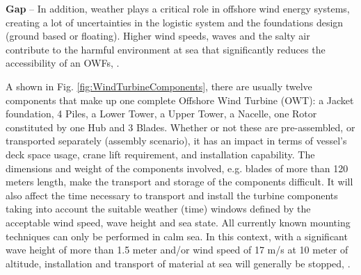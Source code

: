 \textbf{Gap} --
In addition, weather plays a critical role in offshore wind energy systems, creating a lot of uncertainties in the logistic system and the foundations design (ground based or floating). Higher wind speeds, waves and the salty air contribute to the harmful environment at sea that significantly reduces the accessibility of an OWFs, \cite{Smit_2007, Walker_2013}.

A shown in Fig. \ref{fig:WindTurbineComponents}, there are usually twelve components that make up one complete Offshore Wind Turbine (OWT): a Jacket foundation, 4 Piles, a Lower Tower, a Upper Tower, a Nacelle, one Rotor constituted by one Hub and 3 Blades. Whether or not these are pre-assembled, or transported separately (assembly scenario), it has an impact in terms of vessel’s deck space usage, crane lift requirement, and installation capability. The dimensions and weight of the components involved, e.g. blades of more than 120 meters length, make the transport and storage of the components difficult. It will also affect the time necessary to transport and install the turbine components taking into account the suitable weather (time) windows defined by the acceptable wind speed, wave height and sea state. All currently known mounting techniques can only be performed in calm sea. In this context, with a significant wave height of more than 1.5 meter and/or wind speed of 17 m/s at 10 meter of altitude, installation and transport of material at sea will generally be stopped, \cite{aitsimulation}.
